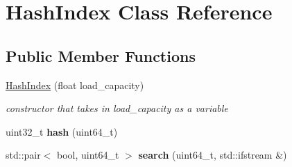 \hypertarget{class_hash_index}{}\section{Hash\+Index Class Reference}
\label{class_hash_index}
\subsection*{Public Member Functions}
\begin{DoxyCompactItemize}
\item 
\hypertarget{class_hash_index_a42b72951825c779461709d0ce309f314}{}\hyperlink{class_hash_index_a42b72951825c779461709d0ce309f314}{Hash\+Index} (float load\+\_\+capacity)\label{class_hash_index_a42b72951825c779461709d0ce309f314}

\begin{DoxyCompactList}\small\item\em constructor that takes in load\+\_\+capacity as a variable \end{DoxyCompactList}\item 
\hypertarget{class_hash_index_a649efbc49a59fc99180af0a5c8a63f60}{}uint32\+\_\+t {\bfseries hash} (uint64\+\_\+t)\label{class_hash_index_a649efbc49a59fc99180af0a5c8a63f60}

\item 
\hypertarget{class_hash_index_ac1322500f9a4eb1cb714680e99230286}{}std\+::pair$<$ bool, uint64\+\_\+t $>$ {\bfseries search} (uint64\+\_\+t, std\+::ifstream \&)\label{class_hash_index_ac1322500f9a4eb1cb714680e99230286}


\end{DoxyCompactItemize}
